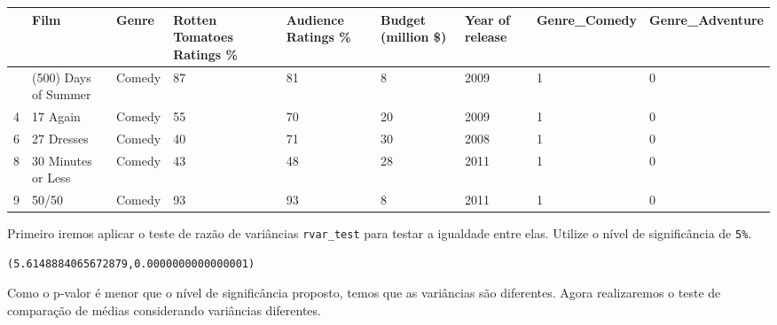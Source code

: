 \documentclass[
  letterpaper,
  DIV=11,
  numbers=noendperiod]{scrreprt}
\newenvironment{Shaded}{\begin{snugshade}}{\end{snugshade}}
\newcommand{\DecValTok}[1]{\textcolor[rgb]{0.68,0.00,0.00}{#1}}
\newcommand{\NormalTok}[1]{\textcolor[rgb]{0.00,0.23,0.31}{#1}}
\newcommand{\OperatorTok}[1]{\textcolor[rgb]{0.37,0.37,0.37}{#1}}
\newcommand{\StringTok}[1]{\textcolor[rgb]{0.13,0.47,0.30}{#1}}
\begin{document}
\begin{longtable}[]{@{}lllllllll@{}}
\toprule\noalign{}
& Film & Genre & Rotten Tomatoes Ratings \% & Audience Ratings \% &
Budget (million \$) & Year of release & Genre\_Comedy &
Genre\_Adventure \\
\midrule\noalign{}
\endhead
\bottomrule\noalign{}
\endlastfoot
0 & (500) Days of Summer & Comedy & 87 & 81 & 8 & 2009 & 1 & 0 \\
4 & 17 Again & Comedy & 55 & 70 & 20 & 2009 & 1 & 0 \\
6 & 27 Dresses & Comedy & 40 & 71 & 30 & 2008 & 1 & 0 \\
8 & 30 Minutes or Less & Comedy & 43 & 48 & 28 & 2011 & 1 & 0 \\
9 & 50/50 & Comedy & 93 & 93 & 8 & 2011 & 1 & 0 \\
\end{longtable}

Primeiro iremos aplicar o teste de razão de variâncias
\texttt{rvar\_test} para testar a igualdade entre elas. Utilize o nível
de significância de \texttt{5\%}.

\begin{Shaded}
\end{Shaded}

\begin{tcolorbox}[enhanced jigsaw, breakable, leftrule=.75mm, left=2mm, opacityback=0, bottomrule=.15mm, toprule=.15mm, rightrule=.15mm, arc=.35mm, colback=white]

\begin{verbatim}
(5.6148884065672879,0.0000000000000001)
\end{verbatim}

\end{tcolorbox}

Como o p-valor é menor que o nível de significância proposto, temos que
as variâncias são diferentes. Agora realizaremos o teste de comparação
de médias considerando variâncias diferentes.

\begin{Shaded}
\end{Shaded}
\end{document}
